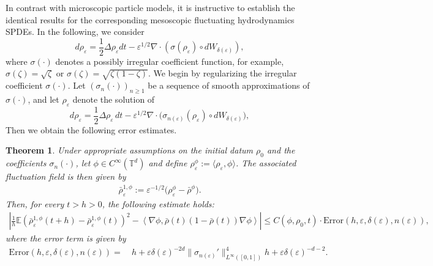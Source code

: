 \documentclass[UTF-8,reqno]{amsart}
\numberwithin{equation}{section}
\newtheorem{theorem}{Theorem}[section]
\def\geq{\geqslant}
\def\leq{\leqslant}
\def\geq{\geqslant}
\def\leq{\leqslant}
\begin{document}
In contrast with microscopic particle models, it is instructive to establish the identical results for the corresponding mesoscopic fluctuating hydrodynamics SPDEs. In the following, we consider 
\begin{equation}\label{SPDE-2-intro}
d\rho_{\varepsilon}=\frac{1}{2}\Delta\rho_{\varepsilon}dt-\varepsilon^{1/2}\nabla\cdot(\sigma(\rho_{\varepsilon})\circ dW_{\delta(\varepsilon)}), 	
\end{equation}
where $\sigma(\cdot)$ denotes a possibly irregular coefficient function, for example, $\sigma(\zeta)=\sqrt{\zeta}$ or $\sigma(\zeta)=\sqrt{\zeta(1-\zeta)}$. We begin by regularizing the irregular coefficient $\sigma(\cdot)$. Let $(\sigma_n(\cdot))_{n\geq1}$ be a sequence of smooth approximations of $\sigma(\cdot)$, and let $\rho_{\varepsilon}$ denote the solution of 
\begin{equation}\label{SPDE-3-intro}
d\rho_{\varepsilon}=\frac{1}{2}\Delta\rho_{\varepsilon}\,dt-\varepsilon^{1/2}\nabla\cdot\bigl(\sigma_{n(\varepsilon)}(\rho_{\varepsilon})\circ dW_{\delta(\varepsilon)}\bigr), 	
\end{equation}
Then we obtain the following error estimates.
\begin{theorem}\label{thm-3-intro}
Under appropriate assumptions on the initial datum $\rho_0$ and the coefficients $\sigma_n(\cdot)$, let $\phi \in C^{\infty}(\mathbb{T}^d)$ and define $\rho_{\varepsilon}^{\phi} := \langle \rho_{\varepsilon}, \phi \rangle$. The associated fluctuation field is then given by
\begin{align*}
\bar{\rho}_{\varepsilon}^{1,\phi} := \varepsilon^{-1/2} \big( \rho_{\varepsilon}^{\phi} - \bar{\rho}^{\phi} \big).
\end{align*}
Then, for every $t > h > 0$, the following estimate holds:
\begin{align*}
\left| \frac{1}{h} \mathbb{E} \left( \bar{\rho}_{\varepsilon}^{1,\phi}(t+h) - \bar{\rho}_{\varepsilon}^{1,\phi}(t) \right)^2 
- \left\langle \nabla \phi, \bar{\rho}(t)(1 - \bar{\rho}(t)) \nabla \phi \right\rangle \right|
\leq C(\phi, \rho_0, t) \cdot \mathrm{Error}(h, \varepsilon, \delta(\varepsilon), n(\varepsilon)),
\end{align*}
where the error term is given by
\begin{align*}
\mathrm{Error}(h, \varepsilon, \delta(\varepsilon), n(\varepsilon)) =\ & h 
+ \varepsilon \delta(\varepsilon)^{-2d} \|\sigma_{n(\varepsilon)}'\|_{L^{\infty}([0,1])}^4 h +\varepsilon \delta(\varepsilon)^{-d-2}. 
\end{align*}
\end{theorem}
\end{document}
